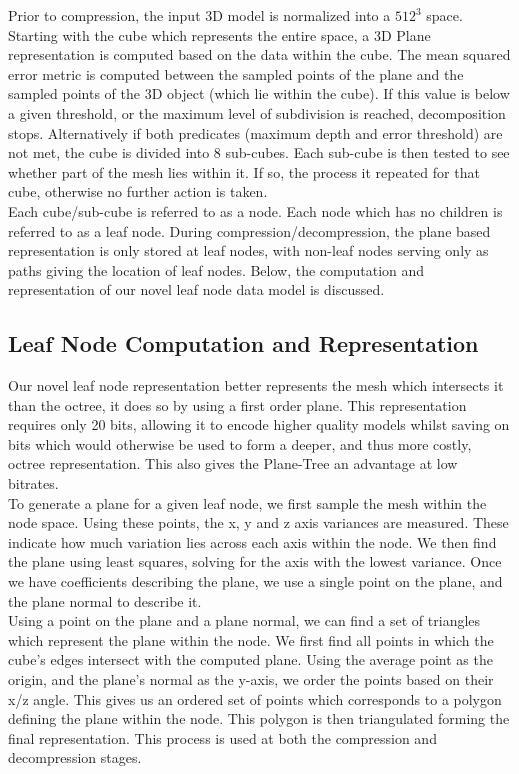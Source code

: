 Prior to compression, the input 3D model is normalized into a $512^3$ space. Starting with the cube which represents the entire space, a 3D Plane representation is computed based on the data within the cube. The mean squared error metric is computed between the sampled points of the plane and the sampled points of the 3D object (which lie within the cube). If this value is below a given threshold, or the maximum level of subdivision is reached, decomposition stops. Alternatively if both predicates (maximum depth and error threshold) are not met, the cube is divided into 8 sub-cubes. Each sub-cube is then tested to see whether part of the mesh lies within it. If so, the process it repeated for that cube, otherwise no further action is taken. \\

Each cube/sub-cube is referred to as a node. Each node which has no children is referred to as a leaf node. During compression/decompression, the plane based representation is only stored at leaf nodes, with non-leaf nodes serving only as paths giving the location of leaf nodes. Below, the computation and representation of our novel leaf node data model is discussed. \\

\subsection{Leaf Node Computation and Representation}
\label{NRep}

Our novel leaf node representation better represents the mesh which intersects it than the octree, it does so by using a first order plane. This representation requires only 20 bits, allowing it to encode higher quality models whilst saving on bits which would otherwise be used to form a deeper, and thus more costly, octree representation. This also gives the Plane-Tree an advantage at low bitrates. \\

To generate a plane for a given leaf node, we first sample the mesh within the node space. Using these points, the x, y and z axis variances are measured. These indicate how much variation lies across each axis within the node. We then find the plane using least squares, solving for the axis with the lowest variance. Once we have coefficients describing the plane, we use a single point on the plane, and the plane normal to describe it. \\

Using a point on the plane and a plane normal, we can find a set of triangles which represent the plane within the node. We first find all points in which the cube's edges intersect with the computed plane. Using the average point as the origin, and the plane's normal as the y-axis, we order the points based on their x/z angle. This gives us an ordered set of points which corresponds to a polygon defining the plane within the node. This polygon is then triangulated forming the final representation. This process is used at both the compression and decompression stages. \\

